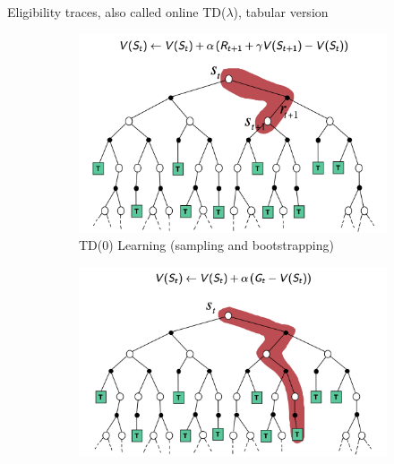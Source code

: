 \begin{algorithm}[H]
\DontPrintSemicolon
{}
\caption{Eligibility traces, also called online TD($\lambda$), tabular version}
\label{algo:eligibility-traces}
\end{algorithm}


\begin{figure}[H]
    \centering
    \begin{subfigure}{0.3\textwidth}
        \includegraphics[width=\linewidth]{figures/backup-td.png}
        \caption{TD(0) Learning (sampling and bootstrapping)}
        \label{fig:backup-td}
    \end{subfigure}
    \begin{subfigure}{0.3\textwidth}
        \includegraphics[width=\linewidth]{figures/backup-mc.png}

\end{subfigure}
\end{figure}
